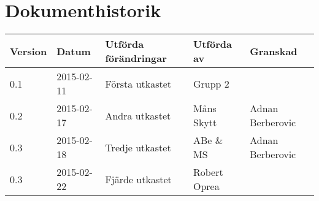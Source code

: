 \documentclass[11pt]{article}
\begin{document}
\section*{Dokumenthistorik}
\begin{table}[h]
\begin{tabular}{|l|l|l|l|l|} \hline

Version & 
Datum & 
Utförda förändringar & 
Utförda av & 
Granskad \\[0.1in] \hline
0.1 &
2015-02-11 & 
Första utkastet & 
Grupp 2 & 
\\ \hline

0.2 &
2015-02-17 & 
Andra utkastet & 
Måns Skytt & 
Adnan Berberovic\\ \hline

0.3 &
2015-02-18 &
Tredje utkastet &
ABe \& MS &
Adnan Berberovic \\ \hline

0.3 &
2015-02-22 &
Fjärde utkastet &
Robert Oprea &
 \\ \hline

\end{tabular}
\end{table}


\pagebreak

\end{document}
